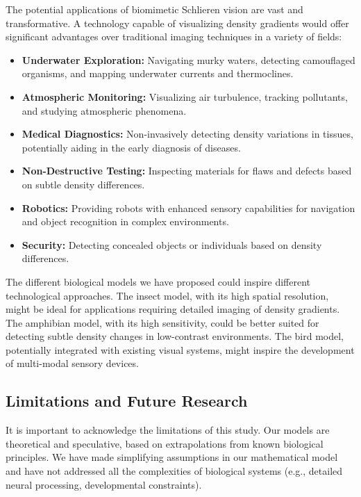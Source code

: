 \documentclass[11pt]{article}
\begin{document}
The potential applications of biomimetic Schlieren vision are vast and transformative. A technology capable of visualizing density gradients would offer significant advantages over traditional imaging techniques in a variety of fields:
\begin{itemize}
    \item \textbf{Underwater Exploration:} Navigating murky waters, detecting camouflaged organisms, and mapping underwater currents and thermoclines.
    \item \textbf{Atmospheric Monitoring:} Visualizing air turbulence, tracking pollutants, and studying atmospheric phenomena.
    \item \textbf{Medical Diagnostics:} Non-invasively detecting density variations in tissues, potentially aiding in the early diagnosis of diseases.
    \item \textbf{Non-Destructive Testing:} Inspecting materials for flaws and defects based on subtle density differences.
    \item \textbf{Robotics:} Providing robots with enhanced sensory capabilities for navigation and object recognition in complex environments.
    \item \textbf{Security:} Detecting concealed objects or individuals based on density differences.
\end{itemize}
The different biological models we have proposed could inspire different technological approaches. The insect model, with its high spatial resolution, might be ideal for applications requiring detailed imaging of density gradients. The amphibian model, with its high sensitivity, could be better suited for detecting subtle density changes in low-contrast environments. The bird model, potentially integrated with existing visual systems, might inspire the development of multi-modal sensory devices.

\subsection{Limitations and Future Research}

It is important to acknowledge the limitations of this study. Our models are theoretical and speculative, based on extrapolations from known biological principles. We have made simplifying assumptions in our mathematical model and have not addressed all the complexities of biological systems (e.g., detailed neural processing, developmental constraints).
\end{document}
